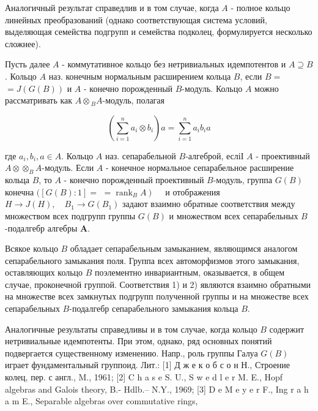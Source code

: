 \documentclass[10pt]{article}
\begin{document}
Аналогичный результат справедлив и в том случае, когда $A$ - полное кольцо линейных преобразований (однако соответствующая система условий, выделяющая семейства подгрупп и семейства подколец, формулируется несколько сложнее).



Пусть далее $A$ - коммутативное кольцо без нетривиальных идемпотентов и $A \supseteq B$. Кольцо $A$ наз. конечным нормальным расширением кольца $B$, если $B=$ $=J(G(B))$ и $A$ - конечно порожденный $B$-модуль. Кольцо $A$ можно рассматривать как $A \otimes{ }_{B} A$-модуль, полагая



\[

\left(\sum_{i=1}^{n} a_{i} \otimes b_{i}\right) a=\sum_{i=1}^{n} a_{i} b_{i} a

\]



где $a_{i}, b_{i}, a \in A$. Кольцо $A$ наз. сепарабельной $B$-алгеброй, есліІ $A$ - проективный $A \otimes \otimes_{B} A$-модуль. Если $A$ - конечное нормальное сепарабельное расширение кольца $B$, то $A$ - конечно порожденный проективный $B$-модуль, группа $G(B)$ конечна $([G(B): 1]=$ $\left.=\operatorname{rank}_{B} A\right) \quad$ и отображения $H \rightarrow J(H), \quad B_{1} \rightarrow G\left(B_{1}\right)$ задают взаимно обратные соответствия между множеством всех подгрупп группы $G(B)$ и множеством всех сепарабельных $B$-подалгебр алгебры $\boldsymbol{A}$.



Всякое кольцо $B$ обладает сепарабельным замыканием, являющимся аналогом сепарабельного замыкания поля. Группа всех автоморфизмов этого замыкания, оставляющих кольцо $B$ поэлементно инвариантным, оказывается, в общем случае, проконечной группой. Соответствия 1) и 2) являются взаимно обратными на множестве всех замкнутых подгрупп полученной группы и на множестве всех сепарабельных $B$-подалгебр сепарабельного замыкания кольца $B$.



Аналогичные результаты справедливы и в том случае, когда кольцо $B$ содержит нетривиальные идемпотенты. При этом, однако, ряд основных понятий подвергается существенному изменению. Напр., роль группы Галуа $G(B)$ играет фундаментальный группоид. Лит.: [1] Д ж е к о б с о н Н., Строение колец, пер. с англ., M., 1961; [2] C h a s e S. U., S w e d l e r M. E., Hopf algebras and Galois theory, B.- Hdlb.-- N.Y., 1969; [3] D e M e y e r F., Ing r a h a m E., Separable algebras over commutative rings,
\end{document}
